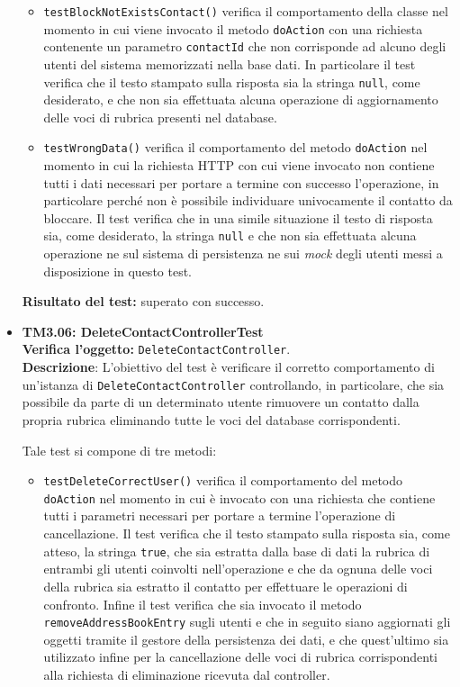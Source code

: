 \begin{itemize}
\begin{itemize}
\item \texttt{testBlockNotExistsContact()} verifica il comportamento della classe nel momento in cui viene invocato il metodo \texttt{doAction} con una richiesta contenente un parametro \texttt{contactId} che non corrisponde ad alcuno degli utenti del sistema memorizzati nella base dati. In particolare il test verifica che il testo stampato sulla risposta sia la stringa \texttt{null}, come desiderato, e che non sia effettuata alcuna operazione di aggiornamento delle voci di rubrica presenti nel database.

\item \texttt{testWrongData()} verifica il comportamento del metodo \texttt{doAction} nel momento in cui la richiesta HTTP con cui viene invocato non contiene tutti i dati necessari per portare a termine con successo l'operazione, in particolare perché non è possibile individuare univocamente il contatto da bloccare. Il test verifica che in una simile situazione il testo di risposta sia, come desiderato, la stringa \texttt{null} e che non sia effettuata alcuna operazione ne sul sistema di persistenza ne sui \textit{mock} degli utenti messi a disposizione in questo test.
\end{itemize}
\textbf{Risultato del test:} superato con successo.

\item \textbf{TM3.06: DeleteContactControllerTest}\\
\textbf{Verifica l'oggetto:} \texttt{DeleteContactController}.\\
\textbf{Descrizione}: L'obiettivo del test è verificare il corretto comportamento di un'istanza di \texttt{DeleteContactController} controllando, in particolare, che sia possibile da parte di un determinato utente rimuovere un contatto dalla propria rubrica eliminando tutte le voci del database corrispondenti.

Tale test si compone di tre metodi:
\begin{itemize}
\item \texttt{testDeleteCorrectUser()} verifica il comportamento del metodo \texttt{doAction} nel momento in cui è invocato con una richiesta che contiene tutti i parametri necessari per portare a termine l'operazione di cancellazione. Il test verifica che il testo stampato sulla risposta sia, come atteso, la stringa \texttt{true}, che sia estratta dalla base di dati la rubrica di entrambi gli utenti coinvolti nell'operazione e che da ognuna delle voci della rubrica sia estratto il contatto per effettuare le operazioni di confronto. Infine il test verifica che sia invocato il metodo \texttt{removeAddressBookEntry} sugli utenti e che in seguito siano aggiornati gli oggetti tramite il gestore della persistenza dei dati, e che quest'ultimo sia utilizzato infine per la cancellazione delle voci di rubrica corrispondenti alla richiesta di eliminazione ricevuta dal controller.


\end{itemize}
\end{itemize}
